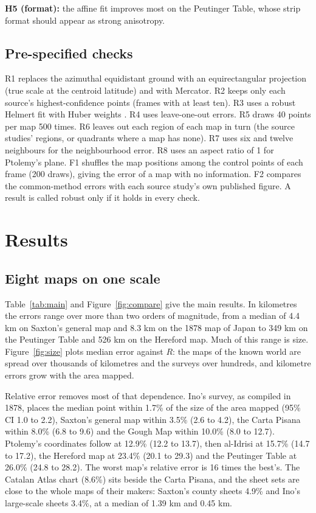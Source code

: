 \documentclass[11pt,a4paper]{article}
\begin{document}
\textbf{H5 (format):} the affine fit improves most on the Peutinger Table, whose strip format should appear as strong anisotropy.

\subsection{Pre-specified checks}
R1 replaces the azimuthal equidistant ground with an equirectangular projection (true scale at the centroid latitude) and with Mercator. R2 keeps only each source's highest-confidence points (frames with at least ten). R3 uses a robust Helmert fit with Huber weights \citep{huber1964}. R4 uses leave-one-out errors. R5 draws 40 points per map 500 times. R6 leaves out each region of each map in turn (the source studies' regions, or quadrants where a map has none). R7 uses six and twelve neighbours for the neighbourhood error. R8 uses an aspect ratio of 1 for Ptolemy's plane. F1 shuffles the map positions among the control points of each frame (200 draws), giving the error of a map with no information. F2 compares the common-method errors with each source study's own published figure. A result is called robust only if it holds in every check.

\section{Results}\label{sec:results}
\subsection{Eight maps on one scale}
Table~\ref{tab:main} and Figure~\ref{fig:compare} give the main results. In kilometres the errors range over more than two orders of magnitude, from a median of 4.4 km on Saxton's general map and 8.3 km on the 1878 map of Japan to 349 km on the Peutinger Table and 526 km on the Hereford map. Much of this range is size. Figure~\ref{fig:size} plots median error against $R$: the maps of the known world are spread over thousands of kilometres and the surveys over hundreds, and kilometre errors grow with the area mapped.

Relative error removes most of that dependence. Ino's survey, as compiled in 1878, places the median point within 1.7\% of the size of the area mapped (95\% CI 1.0 to 2.2), Saxton's general map within 3.5\% (2.6 to 4.2), the Carta Pisana within 8.0\% (6.8 to 9.6) and the Gough Map within 10.0\% (8.0 to 12.7). Ptolemy's coordinates follow at 12.9\% (12.2 to 13.7), then al-Idrisi at 15.7\% (14.7 to 17.2), the Hereford map at 23.4\% (20.1 to 29.3) and the Peutinger Table at 26.0\% (24.8 to 28.2). The worst map's relative error is 16 times the best's. The Catalan Atlas chart (8.6\%) sits beside the Carta Pisana, and the sheet sets are close to the whole maps of their makers: Saxton's county sheets 4.9\% and Ino's large-scale sheets 3.4\%, at a median of 1.39 km and 0.45 km.
\end{document}
